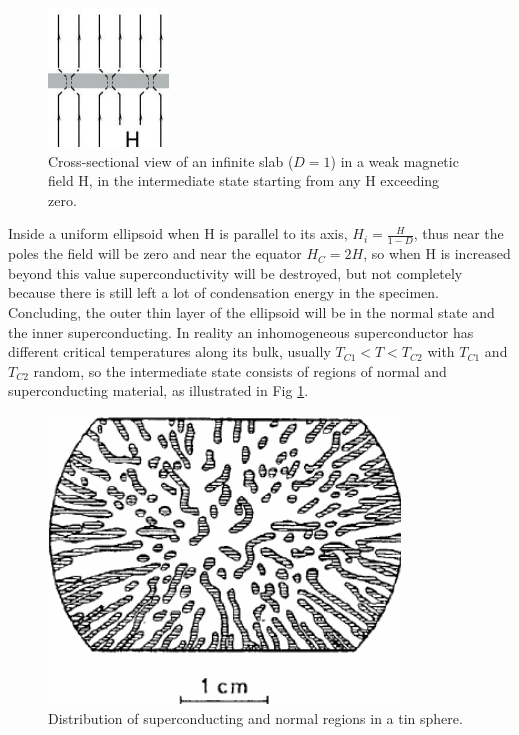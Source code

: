 \documentclass[openany,11pt,a4paper]{report}
\begin{document}
\begin{figure}[H]
\centering
\includegraphics[scale=1]{flatslab.PNG}
\caption{Cross-sectional view of an infinite slab ($D=1$) in a weak magnetic field H, in the intermediate state starting from any H exceeding zero. \cite{intermediate}}
\end{figure}

Inside a uniform ellipsoid when H is parallel to its axis, $H_{i}= \frac{H}{1- D}$, thus near the poles the field will be zero and near the equator $H_{C}=2H$, so when H is increased beyond this value superconductivity will be destroyed, but not completely because there is still left a lot of condensation energy in the specimen. \cite{intermediate} Concluding, the outer thin layer of the ellipsoid will be in the normal state and the inner superconducting. In reality an inhomogeneous superconductor has different  critical temperatures along its bulk, usually $T_{C1}<T<T_{C2}$ with $T_{C1}$ and  $T_{C2}$ random, so the intermediate state consists of regions of normal and superconducting material, as illustrated in Fig \ref{intermediate}.


\begin{figure}[hbtp]
\centering
\includegraphics[scale=.61]{intermediate.PNG}
\caption{Distribution of superconducting and normal regions in a tin sphere. \cite{demag}}
\label{intermediate}
\end{figure}
 
\end{document}
